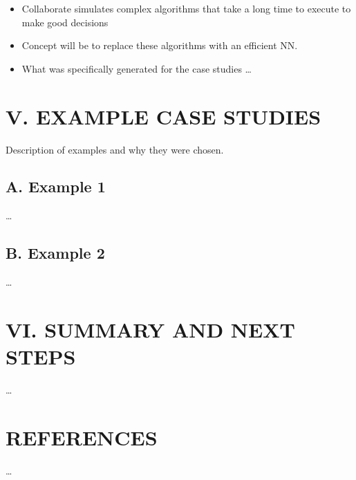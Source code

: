 \documentclass[11pt]{article}
\begin{document}
\begin{itemize}
\item Collaborate simulates complex algorithms that take a long time to execute to
make good decisions

\item Concept will be to replace these algorithms with an efficient NN.

\item What was specifically generated for the case studies \ldots{}
\end{itemize}

\section*{V. EXAMPLE CASE STUDIES}
\label{sec:orgf49f226}

Description of examples and why they were chosen.

\subsection*{A. Example 1}
\label{sec:org09f60a0}

\ldots{}

\subsection*{B. Example 2}
\label{sec:org00fe754}

\ldots{}

\section*{VI. SUMMARY AND NEXT STEPS}
\label{sec:orgb32679a}

\ldots{}

\section*{REFERENCES}
\label{sec:orgc00bb67}

\ldots{}
\end{document}

